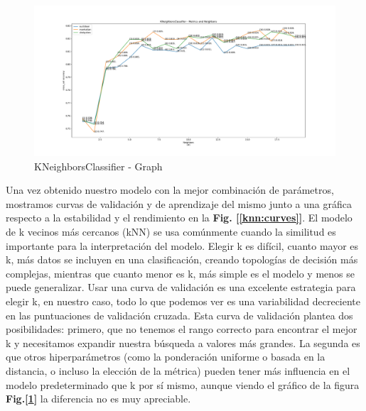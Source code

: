 \documentclass[12pt,twoside]{report}
\begin{document}
\begin{figure}[h!]
\includegraphics[width=\textwidth]{./code/figures_python/parameters/knn_graph.pdf}
\caption{KNeighborsClassifier - Graph}
\label{knn:graph}
\end{figure}

Una vez obtenido nuestro modelo con la mejor combinación de parámetros, mostramos curvas de validación y de aprendizaje del mismo junto a una gráfica respecto a la estabilidad y el rendimiento en la \textbf{Fig. [\ref{knn:curves}]}. El modelo de k vecinos más cercanos (kNN) se usa comúnmente cuando la similitud es importante para la interpretación del modelo. Elegir k es difícil, cuanto mayor es k, más datos se incluyen en una clasificación, creando topologías de decisión más complejas, mientras que cuanto menor es k, más simple es el modelo y menos se puede generalizar. Usar una curva de validación es una excelente estrategia para elegir k, en nuestro caso, todo lo que podemos ver es una variabilidad decreciente en las puntuaciones de validación cruzada.
 Esta curva de validación plantea dos posibilidades: primero, que no tenemos el rango correcto para encontrar el mejor k y necesitamos expandir nuestra búsqueda a valores más grandes. La segunda es que otros hiperparámetros (como la ponderación uniforme o basada en la distancia, o incluso la elección de la métrica) pueden tener más influencia en el modelo predeterminado que k por sí mismo, aunque viendo el gráfico de la figura \textbf{Fig.[\ref{knn:graph}]} la diferencia no es muy apreciable.
\end{document}
